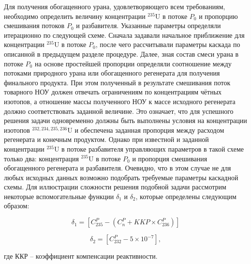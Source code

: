 Для получения обогащенного урана, удовлетворяющего всем требованиям, необходимо определить величину концентрации $^{235}$U в потоке $P_0$ и пропорцию смешивания потоков $P_0$ и разбавителя. Указанные параметры определяли итерационно по следующей схеме. Сначала задавали начальное приближение для концентрации $^{235}$U в потоке $P_0$, после чего рассчитывали параметры каскада по описанной в предыдущем разделе процедуре. Далее, зная состав смеси урана в потоке $P_0$ на основе простейшей пропорции определяли соотношение между потоками природного урана или обогащенного регенерата для получения финального продукта. При этом полученный в результате смешивания поток товарного НОУ должен отвечать ограничениям по концентрациям чётных изотопов, а отношение массы полученного НОУ к массе исходного регенерата должно соответствовать заданной величине. Это означает, что для успешного решения задачи одновременно должны быть выполнены условия на концентрации изотопов $^{232,234,235,236}$U и обеспечена заданная пропорция между расходом регенерата и конечным продуктом. Однако при известной и заданной концентрации $^{235}$U в потоке разбавителя управляющих параметров в такой схеме только два: концентрация $^{235}$U в потоке $P_0$ и пропорция смешивания обогащенного регенерата и разбавителя. Очевидно, что в этом случае не для любых исходных данных возможно подобрать требуемые параметры каскадной схемы. 
Для иллюстрации сложности решения подобной задачи рассмотрим некоторые вспомогательные функции $\delta_1$ и $\delta_2$, которые определены следующим образом:

\begin{equation} \label{d1} 
  \delta_1=\left[C_{235}^P-\left(C_n^P+KKP\times C_{236}^P\right)\right]
\end{equation} 

\begin{equation} \label{d2} 
    \delta_2=\left[C_{232}^P-5\times10^{-7}\right],             
\end{equation}

где ККР -- коэффициент компенсации реактивности.

